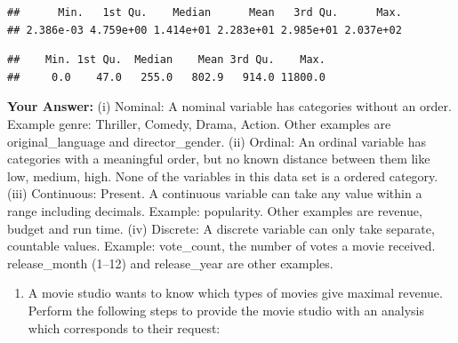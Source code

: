 \documentclass[
]{article}
\newenvironment{Shaded}{\begin{snugshade}}{\end{snugshade}}
\newcommand{\CommentTok}[1]{\textcolor[rgb]{0.56,0.35,0.01}{\textit{#1}}}
\newcommand{\FunctionTok}[1]{\textcolor[rgb]{0.13,0.29,0.53}{\textbf{#1}}}
\newcommand{\NormalTok}[1]{#1}
\newcommand{\SpecialCharTok}[1]{\textcolor[rgb]{0.81,0.36,0.00}{\textbf{#1}}}
\providecommand{\tightlist}{%
  \setlength{\itemsep}{0pt}\setlength{\parskip}{0pt}}
\begin{document}
\begin{Shaded}
\end{Shaded}

\begin{verbatim}
##      Min.   1st Qu.    Median      Mean   3rd Qu.      Max. 
## 2.386e-03 4.759e+00 1.414e+01 2.283e+01 2.985e+01 2.037e+02
\end{verbatim}

\begin{Shaded}
\end{Shaded}

\begin{verbatim}
##    Min. 1st Qu.  Median    Mean 3rd Qu.    Max. 
##     0.0    47.0   255.0   802.9   914.0 11800.0
\end{verbatim}

\textbf{Your Answer:} (i) Nominal: A nominal variable has categories
without an order. Example genre: Thriller, Comedy, Drama, Action. Other
examples are original\_language and director\_gender. (ii) Ordinal: An
ordinal variable has categories with a meaningful order, but no known
distance between them like low, medium, high. None of the variables in
this data set is a ordered category. (iii) Continuous: Present. A
continuous variable can take any value within a range including
decimals. Example: popularity. Other examples are revenue, budget and
run time. (iv) Discrete: A discrete variable can only take separate,
countable values. Example: vote\_count, the number of votes a movie
received. release\_month (1--12) and release\_year are other examples.

\begin{enumerate}
\def\labelenumi{\arabic{enumi}.}
\setcounter{enumi}{2}
\tightlist
\item
  A movie studio wants to know which types of movies give maximal
  revenue. Perform the following steps to provide the movie studio with
  an analysis which corresponds to their request:
\end{enumerate}
\end{document}
